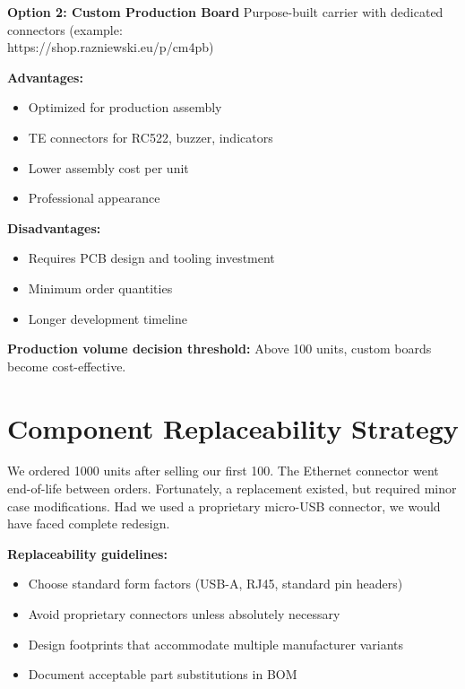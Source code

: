 \textbf{Option 2: Custom Production Board}
Purpose-built carrier with dedicated connectors (example: \\https://shop.razniewski.eu/p/cm4pb)

\textbf{Advantages:}
\begin{itemize}
\item Optimized for production assembly
\item TE connectors for RC522, buzzer, indicators
\item Lower assembly cost per unit
\item Professional appearance
\end{itemize}

\textbf{Disadvantages:}
\begin{itemize}
\item Requires PCB design and tooling investment
\item Minimum order quantities
\item Longer development timeline
\end{itemize}

\textbf{Production volume decision threshold:} Above 100 units, custom boards become cost-effective.

\section{Component Replaceability Strategy}

\begin{tcolorbox}[colback=red!10,colframe=red!75!black,title=Critical Lesson: Component Obsolescence]
We ordered 1000 units after selling our first 100. The Ethernet connector went end-of-life between orders. Fortunately, a replacement existed, but required minor case modifications. Had we used a proprietary micro-USB connector, we would have faced complete redesign.
\end{tcolorbox}

\textbf{Replaceability guidelines:}
\begin{itemize}
\item Choose standard form factors (USB-A, RJ45, standard pin headers)
\item Avoid proprietary connectors unless absolutely necessary
\item Design footprints that accommodate multiple manufacturer variants
\item Document acceptable part substitutions in BOM
\end{itemize}

